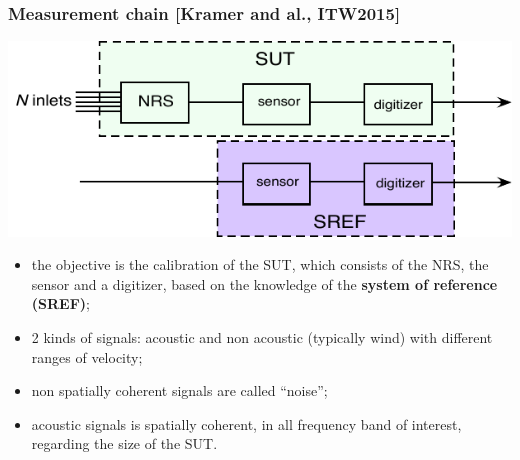 \documentclass[handout,9pt]{beamer}
\begin{document}
\begin{frame}
\frametitle{Measurement chain [Kramer and al., ITW2015]}


\begin{center}
\includegraphics[scale=0.7]{fulltestbedIS26.pdf}
\end{center}



\begin{itemize}
\item
the objective is the calibration of the SUT, which consists of the NRS, the sensor and a digitizer, based on the knowledge of the {\bf system of reference (SREF)};
\item
2 kinds of signals: acoustic and non acoustic (typically wind) with different ranges of velocity;
\item
non spatially coherent signals are called ``noise'';
\item
acoustic signals is spatially coherent, in all frequency band of interest, regarding the size of the SUT. 
\end{itemize}


\end{frame}
\end{document}
